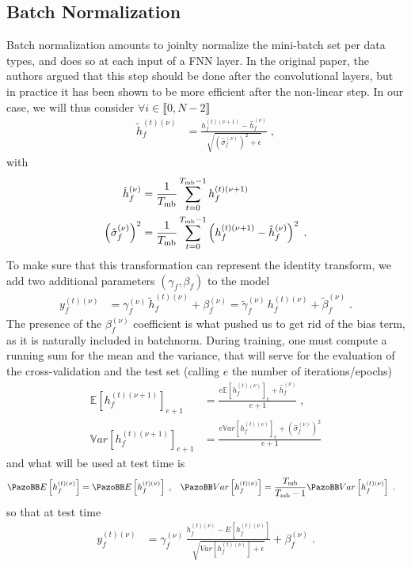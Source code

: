 \subsection{Batch Normalization}

Batch normalization\cite{Ioffe2015} amounts to joinlty normalize the mini-batch set per data types, and does so at each input of a FNN layer. In the original paper, the authors argued that this step should be done after the convolutional layers, but in practice it has been shown to be more efficient after the non-linear step. In our case, we will thus consider $\forall i \in \llbracket 0,N-2\rrbracket$
\begin{align}
\tilde{h}_{f}^{(t)(\nu)}&=\frac{h_{f}^{(t)(\nu+1)}-\hat{h}_{f}^{(\nu)}}
%
{\sqrt{\left(\hat{\sigma}_{f}^{(\nu)}\right)^2+\epsilon}}\;,
\end{align}
with
\begin{align}
\hat{h}_{f}^{(\nu)}&=
%
\frac{1}{T_{{\rm mb}}}\sum^{T_{{\rm mb}}-1}_{t=0}h_{f}^{(t)(\nu+1)}\\
%
\left(\hat{\sigma}_{f}^{(\nu)}\right)^2&=\frac{1}{T_{{\rm mb}}}\sum^{T_{{\rm mb}}-1}_{t=0}
%
\left(h_{f}^{(t)(\nu+1)}-\hat{h}_{f}^{(\nu)}\right)^2\;.
\end{align} To make sure that this transformation can represent the identity transform, we add two additional parameters $(\gamma_f,\beta_f)$ to the model
\begin{align}
y^{(t)(\nu)}_{f}&=\gamma^{(\nu)}_f\,\tilde{h}_{f}^{(t)(\nu)}+\beta^{(\nu)}_f
%
=\tilde{\gamma}^{(\nu)}_f\,h_{f}^{(t)(\nu)}+\tilde{\beta}^{(\nu)}_f\;.
\end{align}
The presence of the $\beta^{(\nu)}_f$ coefficient is what pushed us to get rid of the bias term, as it is naturally included in batchnorm. During training, one must compute a running sum for the mean and the variance, that will serve for the evaluation of the cross-validation and the test set (calling $e$ the number of iterations/epochs) 
\begin{align}
\mathbb{E}\left[h_{f}^{(t)(\nu+1)}\right]_{e+1} &=
%
\frac{e\mathbb{E}\left[h_{f}^{(t)(\nu)}\right]_{e}+\hat{h}_{f}^{(\nu)}}{e+1}\;,\\
%
\mathbb{V}ar\left[h_{f}^{(t)(\nu+1)}\right]_{e+1} &=
%
\frac{e\mathbb{V}ar\left[h_{f}^{(t)(\nu)}\right]_{e}+\left(\hat{\sigma}_{f}^{(\nu)}\right)^2}{e+1}
\end{align}
and what will be used at test time is
\begin{align}
\mathbb{E}\left[h_{f}^{(t)(\nu)}\right]&=\mathbb{E}\left[h_{f}^{(t)(\nu)}\right]\;,&
%
\mathbb{V}ar\left[h_{f}^{(t)(\nu)}\right]&=
%
\frac{T_{{\rm mb}}}{T_{{\rm mb}}-1}\mathbb{V}ar\left[h_{f}^{(t)(\nu)}\right]\;.
\end{align}
so that at test time 
\begin{align}
y^{(t)(\nu)}_{f}&=\gamma^{(\nu)}_f\,\frac{h_{f}^{(t)(\nu)}-E[h_{f}^{(t)(\nu)}]}{\sqrt{Var\left[h_{f}^{(t)(\nu)}\right]+\epsilon}}+\beta^{(\nu)}_f\;.
\end{align}

